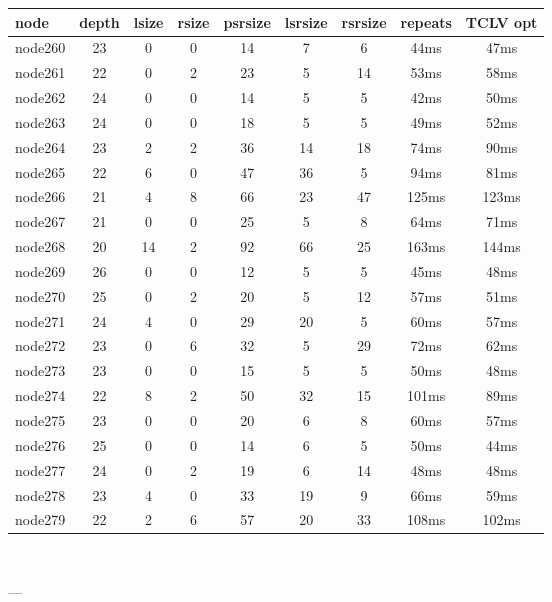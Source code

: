 \begin{tabular}{|l|c|c|c|c|c|c|c|c|}
\hline node & depth & lsize & rsize & psrsize & lsrsize & rsrsize   & repeats & TCLV opt\\
    \hline node260 & 23 & 0 & 0 & 14 & 7 & 6 & 44ms & 47ms\\
    \hline node261 & 22 & 0 & 2 & 23 & 5 & 14 & 53ms & 58ms\\
    \hline node262 & 24 & 0 & 0 & 14 & 5 & 5 & 42ms & 50ms\\
    \hline node263 & 24 & 0 & 0 & 18 & 5 & 5 & 49ms & 52ms\\
    \hline node264 & 23 & 2 & 2 & 36 & 14 & 18 & 74ms & 90ms\\
    \hline node265 & 22 & 6 & 0 & 47 & 36 & 5 & 94ms & 81ms\\
    \hline node266 & 21 & 4 & 8 & 66 & 23 & 47 & 125ms & 123ms\\
    \hline node267 & 21 & 0 & 0 & 25 & 5 & 8 & 64ms & 71ms\\
    \hline node268 & 20 & 14 & 2 & 92 & 66 & 25 & 163ms & 144ms\\
    \hline node269 & 26 & 0 & 0 & 12 & 5 & 5 & 45ms & 48ms\\
    \hline node270 & 25 & 0 & 2 & 20 & 5 & 12 & 57ms & 51ms\\
    \hline node271 & 24 & 4 & 0 & 29 & 20 & 5 & 60ms & 57ms\\
    \hline node272 & 23 & 0 & 6 & 32 & 5 & 29 & 72ms & 62ms\\
    \hline node273 & 23 & 0 & 0 & 15 & 5 & 5 & 50ms & 48ms\\
    \hline node274 & 22 & 8 & 2 & 50 & 32 & 15 & 101ms & 89ms\\
    \hline node275 & 23 & 0 & 0 & 20 & 6 & 8 & 60ms & 57ms\\
    \hline node276 & 25 & 0 & 0 & 14 & 6 & 5 & 50ms & 44ms\\
    \hline node277 & 24 & 0 & 2 & 19 & 6 & 14 & 48ms & 48ms\\
    \hline node278 & 23 & 4 & 0 & 33 & 19 & 9 & 66ms & 59ms\\
    \hline node279 & 22 & 2 & 6 & 57 & 20 & 33 & 108ms & 102ms\\

\hline
\end{tabular} \

---


